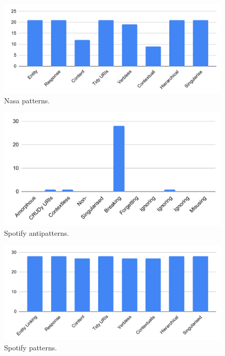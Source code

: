 \documentclass[a4paper,12pt]{article}
\begin{document}
\begin{figure}[!h]
\begin{center}
\includegraphics[keepaspectratio,scale=0.8]{Template_report_LaTeX_EN/img/barchart/nasaBarPatt.pdf}
\caption{Nasa patterns.}
\label{fig:nasaBarPatt}
\end{center}
\end{figure}

\begin{figure}[!h]
\begin{center}
\includegraphics[keepaspectratio,scale=0.8]{Template_report_LaTeX_EN/img/barchart/spotifyBarAnti.pdf}
\caption{Spotify antipatterns.}
\label{fig:spotifyBarAnti}
\end{center}
\end{figure}

\begin{figure}[!h]
\begin{center}
\includegraphics[keepaspectratio,scale=0.8]{Template_report_LaTeX_EN/img/barchart/spotifyBarPatt.pdf}
\caption{Spotify patterns.}
\label{fig:spotifyBarPatt}
\end{center}
\end{figure}
\end{document}
